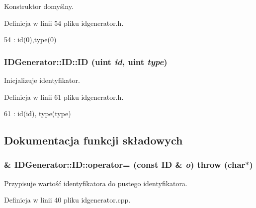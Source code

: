 Konstruktor domyślny. 



Definicja w linii 54 pliku idgenerator.h.




\begin{DoxyCode}
54 : id(0),type(0) {}
\end{DoxyCode}


\hypertarget{classIDGenerator_1_1ID_af7801ab8a1caefa26b551274e5e0530b}{
\subsubsection[{ID}]{\setlength{\rightskip}{0pt plus 5cm}IDGenerator::ID::ID (uint {\em id}, \/  uint {\em type})}}
\label{classIDGenerator_1_1ID_af7801ab8a1caefa26b551274e5e0530b}


Inicjalizuje identyfikator. 



Definicja w linii 61 pliku idgenerator.h.




\begin{DoxyCode}
61 : id(id), type(type) {}
\end{DoxyCode}




\subsection{Dokumentacja funkcji składowych}
\hypertarget{classIDGenerator_1_1ID_a239f6a12bb0b8ddf74bc5a8e2fdffdf4}{
\subsubsection[{operator=}]{ \& IDGenerator::ID::operator= (const {\bf ID} \& {\em o})  throw (char$\ast$)}}
\label{classIDGenerator_1_1ID_a239f6a12bb0b8ddf74bc5a8e2fdffdf4}


Przypisuje wartość identyfikatora do pustego identyfikatora. 



Definicja w linii 40 pliku idgenerator.cpp.



